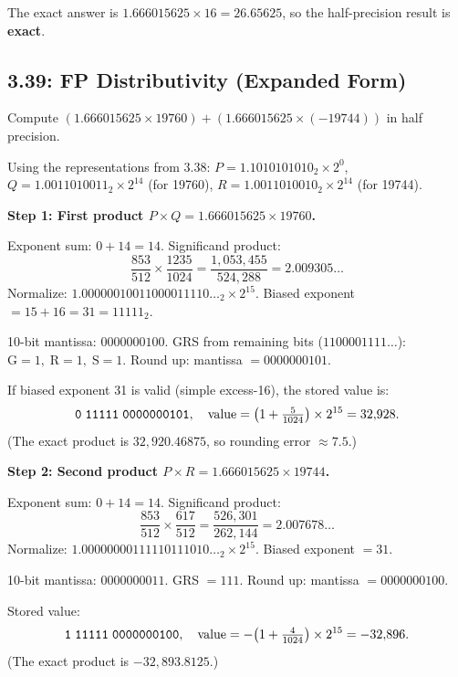 The exact answer is $1.666015625 \times 16 = 26.65625$, so the half-precision
result is \textbf{exact}.

\subsection*{3.39: FP Distributivity (Expanded Form)}
\hypertarget{sol-3.39}{}

Compute $(1.666015625 \times 19760) + (1.666015625 \times (-19744))$ in half
precision.

Using the representations from 3.38:
$P = 1.1010101010_2 \times 2^{0}$,
$Q = 1.0011010011_2 \times 2^{14}$ (for 19760),
$R = 1.0011010010_2 \times 2^{14}$ (for 19744).

\medskip\noindent\textbf{Step 1: First product $P \times Q = 1.666015625 \times
19760$.}

Exponent sum: $0 + 14 = 14$.  Significand product:
\[
  \frac{853}{512} \times \frac{1235}{1024}
  = \frac{1{,}053{,}455}{524{,}288}
  = 2.009305\ldots
\]
Normalize: $1.00000010011000011110\ldots_2 \times 2^{15}$.
Biased exponent $= 15 + 16 = 31 = 11111_2$.

10-bit mantissa: $0000000100$.
GRS from remaining bits ($1100001111\ldots$): $\text{G}=1,\;\text{R}=1,\;
\text{S}=1$.
Round up: mantissa $= 0000000101$.

If biased exponent 31 is valid (simple excess-16), the stored value is:
\[
  \texttt{0\;11111\;0000000101}, \quad
  \text{value} = \bigl(1 + \tfrac{5}{1024}\bigr) \times 2^{15} = 32{,}928.
\]
(The exact product is $32{,}920.46875$, so rounding error $\approx 7.5$.)

\medskip\noindent\textbf{Step 2: Second product $P \times R = 1.666015625 \times
19744$.}

Exponent sum: $0 + 14 = 14$.  Significand product:
\[
  \frac{853}{512} \times \frac{617}{512}
  = \frac{526{,}301}{262{,}144}
  = 2.007678\ldots
\]
Normalize: $1.00000000111110111010\ldots_2 \times 2^{15}$.
Biased exponent $= 31$.

10-bit mantissa: $0000000011$.
GRS $= 111$.
Round up: mantissa $= 0000000100$.

Stored value:
\[
  \texttt{1\;11111\;0000000100}, \quad
  \text{value} = -\bigl(1 + \tfrac{4}{1024}\bigr) \times 2^{15} = -32{,}896.
\]
(The exact product is $-32{,}893.8125$.)

